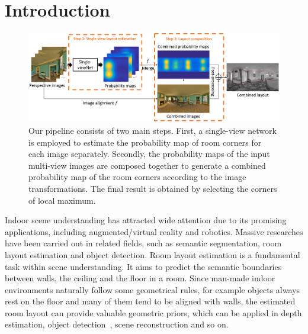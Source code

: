 \section{Introduction}

\begin{figure}
	\centering
	\includegraphics[width=\linewidth]{figs/ppline.png}
	\caption{Our pipeline consists of two main steps. First, a single-view network is employed to estimate the probability map of room corners for each image separately. Secondly, the probability maps of the input multi-view images are composed together to generate a combined probability map of the room corners according to the image transformations. The final result is obtained by selecting the corners of local maximum.
		 }
	\label{fig:overview}
\end{figure}

Indoor scene understanding has attracted wide attention due to its promising applications, including augmented/virtual reality and robotics. Massive researches have been carried out in related fields, such as semantic segmentation, room layout estimation and object detection. 
Room layout estimation is a fundamental task within scene understanding. It aims to predict the semantic boundaries between walls, the ceiling and the floor in a room. 
Since man-made indoor environments naturally follow some geometrical rules, for example objects always rest on the floor and many of them tend to be aligned with walls, the estimated room layout can provide valuable geometric priors, which can be applied in depth estimation, object detection~\cite{hedau2010thinking}, scene reconstruction \cite{lee2017joint} and so on.

